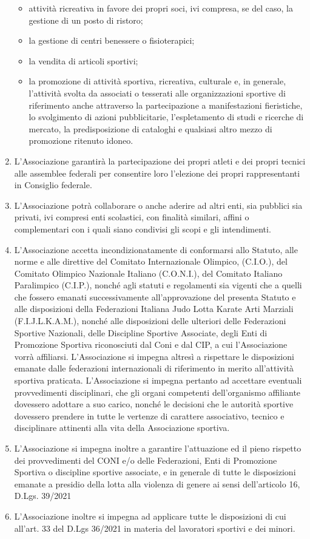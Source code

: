 \documentclass{djtsdoc}
\begin{document}
\begin{enumerate}
\begin{itemize}
			\item attività ricreativa in favore dei propri soci, ivi compresa, se del caso, la gestione di un posto di ristoro;
			\item la gestione di centri benessere o fisioterapici;
			\item la vendita di articoli sportivi;
			\item la promozione di attività sportiva, ricreativa, culturale e, in generale, l'attività svolta da associati o tesserati alle organizzazioni sportive di riferimento anche attraverso la partecipazione a manifestazioni fieristiche, lo svolgimento di azioni pubblicitarie, l'espletamento di studi e ricerche di mercato, la predisposizione di cataloghi e qualsiasi altro mezzo di promozione ritenuto idoneo.
		\end{itemize}
		\item L'Associazione garantirà la partecipazione dei propri atleti e dei propri tecnici alle assemblee federali per consentire loro l'elezione dei propri rappresentanti in Consiglio federale.
		\item L'Associazione potrà collaborare o anche aderire ad altri enti, sia pubblici sia privati, ivi compresi enti scolastici, con finalità similari, affini o complementari con i quali siano condivisi gli scopi e gli intendimenti.
		\item L'Associazione accetta incondizionatamente di conformarsi allo Statuto, alle norme e alle direttive del Comitato Internazionale Olimpico, (C.I.O.), del Comitato Olimpico Nazionale Italiano (C.O.N.I.), del Comitato Italiano Paralimpico (C.I.P.), nonché agli statuti e regolamenti sia vigenti che a quelli che fossero emanati successivamente all'approvazione del presenta Statuto e alle disposizioni della  Federazioni Italiana Judo Lotta Karate Arti Marziali (F.I.J.L.K.A.M.), nonché alle disposizioni delle ulteriori delle Federazioni Sportive Nazionali,  delle Discipline Sportive Associate, degli Enti di Promozione Sportiva riconosciuti dal Coni e dal CIP, a cui l'Associazione vorrà affiliarsi. L'Associazione si impegna altresì a rispettare le disposizioni emanate dalle federazioni internazionali di riferimento in merito all'attività sportiva praticata. L'Associazione si impegna pertanto ad accettare eventuali provvedimenti disciplinari, che gli organi competenti dell'organismo affiliante  dovessero adottare a suo carico, nonché le decisioni che le autorità sportive dovessero prendere in tutte le vertenze di carattere associativo, tecnico e disciplinare attinenti alla vita della Associazione sportiva.
		\item L'Associazione si impegna inoltre a garantire l'attuazione ed il pieno rispetto dei provvedimenti del CONI e/o delle Federazioni, Enti di Promozione Sportiva o discipline sportive associate, e in generale di tutte le disposizioni emanate a presidio della lotta alla violenza di genere ai sensi dell'articolo 16, D.Lgs. 39/2021
		\item L'Associazione inoltre si impegna ad applicare tutte le disposizioni di cui all'art. 33 del D.Lgs 36/2021  in materia del lavoratori sportivi e dei minori.
	\end{enumerate}
	
\end{document}

